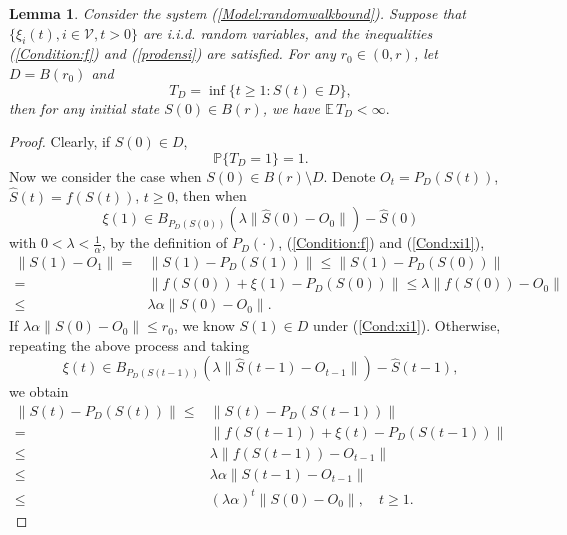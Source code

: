 \documentclass[11pt]{article}
\newtheorem{lem}[thm]{Lemma}
\theoremstyle{definition}
\theoremstyle{remark}
\numberwithin{equation}{section}
\begin{document}
\begin{lem}\label{Lem:mainbounded}
Consider the system  (\ref{Model:randomwalkbound}).
Suppose that $\{\xi_i(t), i\in\mathcal{V}, t>0\}$ are i.i.d. random variables, and the inequalities   (\ref{Condition:f}) and (\ref{prodensi}) are satisfied. For any $r_0\in(0,r)$, let $D=B(r_0)$ and
\begin{equation}\label{Equa:defofT}
  T_D=\inf\{t\geq 1:S(t)\in D\},
\end{equation}
then for any initial state $S(0)\in B(r)$, we have
$\mathbb{E}\,T_D<\infty.$
\end{lem}
\begin{proof}
Clearly, if $S(0)\in D$,
\begin{equation}\label{Equa:Tequ1}
  \mathbb{P}\{T_D=1\}=1.
\end{equation}
Now we consider the case when $S(0)\in B(r)\setminus D$. Denote $O_t=P_D({S(t)})$, $\hat{S}(t)=f(S(t))$, $t\geq 0$, then when
\begin{equation}\label{Cond:xi1}
  \xi(1)\in B_{P_D(S(0))}(\lambda \|\hat{S}(0)-O_0\|)-\hat{S}(0)
\end{equation}
with $0<\lambda< \frac{1}{\alpha}$, by the definition of $P_D(\cdot)$, (\ref{Condition:f}) and (\ref{Cond:xi1}),
\begin{equation}\label{Equa:disderea}
\begin{split}
  \| S(1)-O_1\|=&\| S(1)-P_D(S(1))\|\leq \| S(1)-P_D(S(0))\|\\
  =&\| f(S(0))+\xi(1)-P_D(S(0))\|\leq \lambda\| f(S(0))-O_0\|\\
  \leq& \lambda\alpha\| S(0)-O_0\|.
\end{split}
\end{equation}
If $\lambda\alpha\| S(0)-O_0\|\leq r_0$, we know $S(1)\in D$ under (\ref{Cond:xi1}). Otherwise, repeating the above process and taking
\begin{equation*}
  \xi(t)\in B_{P_D(S(t-1))}(\lambda \| \hat{S}(t-1)-O_{t-1}\|)-\hat{S}(t-1),
\end{equation*}
we obtain
\begin{equation*}
\begin{split}
  \| S(t)-P_D(S(t))\|\leq&\| S(t)-P_D(S(t-1))\|\\
  =&\| f(S(t-1))+\xi(t)-P_D(S(t-1))\|\\
  \leq &\lambda \| f(S(t-1))-O_{t-1}\|\\
  \leq &\lambda\alpha\| S(t-1)-O_{t-1}\|\\
  \leq& (\lambda\alpha)^t\| S(0)-O_0\|,\quad t\geq 1.

\end{split}
\end{equation*}
\end{proof}
\end{document}
